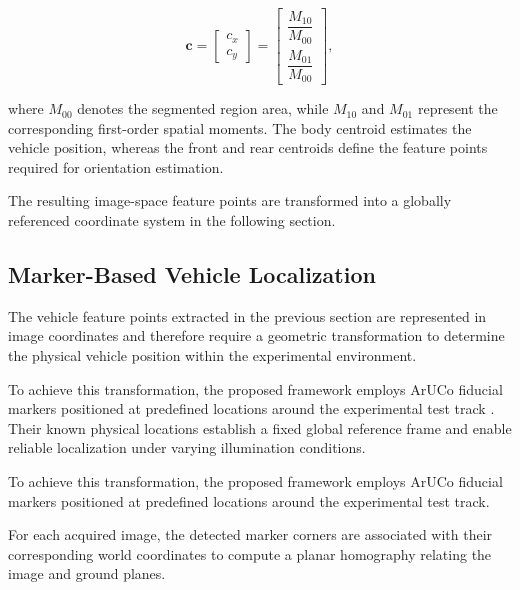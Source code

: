 \begin{equation}
	\mathbf{c}=
	\begin{bmatrix}
		c_x\\
		c_y
	\end{bmatrix}
	=
	\begin{bmatrix}
		\dfrac{M_{10}}{M_{00}}\\[2mm]
		\dfrac{M_{01}}{M_{00}}
	\end{bmatrix},
	\label{eq:centroid}
\end{equation}

where $M_{00}$ denotes the segmented region area, while $M_{10}$ and $M_{01}$ represent the corresponding first-order spatial moments. The body centroid estimates the vehicle position, whereas the front and rear centroids define the feature points required for orientation estimation.

The resulting image-space feature points are transformed into a globally referenced coordinate system in the following section.

\subsection{Marker-Based Vehicle Localization}

The vehicle feature points extracted in the previous section are represented in image coordinates and therefore require a geometric transformation to determine the physical vehicle position within the experimental environment.

To achieve this transformation, the proposed framework employs ArUCo fiducial markers positioned at predefined locations around the experimental test track \cite{garrido2014automatic}. Their known physical locations establish a fixed global reference frame and enable reliable localization under varying illumination conditions.

To achieve this transformation, the proposed framework employs ArUCo fiducial markers positioned at predefined locations around the experimental test track.

For each acquired image, the detected marker corners are associated with their corresponding world coordinates to compute a planar homography relating the image and ground planes.

